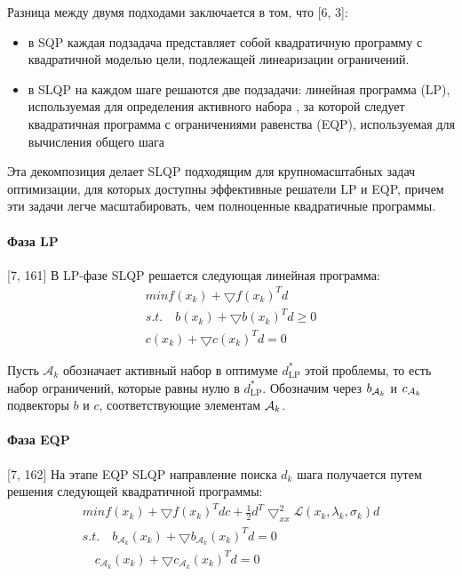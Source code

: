 \documentclass[12pt,a4paper]{article}
\begin{document}
	Разница между двумя подходами заключается в том, что [6, 3]:
	\begin{itemize}
		\item в SQP каждая подзадача представляет собой квадратичную программу с квадратичной моделью цели, подлежащей линеаризации ограничений.
		\item в SLQP на каждом шаге решаются две подзадачи: линейная программа (LP), используемая для определения активного набора , за которой следует квадратичная программа с ограничениями равенства (EQP), используемая для вычисления общего шага
	\end{itemize}
	
	Эта декомпозиция делает SLQP подходящим для крупномасштабных задач оптимизации, для которых доступны эффективные решатели LP и EQP, причем эти задачи легче масштабировать, чем полноценные квадратичные программы.
	
	\paragraph{Фаза LP}[7, 161]
	В LP-фазе SLQP решается следующая линейная программа:
	\begin{align*}
		min f(x_k) + \bigtriangledown f(x_k)^Td \\
		s.t. \quad b(x_k) + \bigtriangledown b(x_k)^Td \geq 0 \\
		c(x_k) + \bigtriangledown c(x_k)^Td=0
	\end{align*}
	
	Пусть $\mathcal{A}_{k}$ обозначает активный набор в оптимуме $ d_{\text{LP}}^{*}$ этой проблемы, то есть набор ограничений, которые равны нулю в $d_{\text{LP}}^{*}$. Обозначим через $b_{{\cal{A}}_{k}}$ и $c_{{\cal{A}}_{k}}$ подвекторы $b$ и $c$, соответствующие элементам ${\cal{A}}_{k}$.
	
	\paragraph{Фаза EQP}[7, 162]
	На этапе EQP SLQP направление поиска $d_{k}$ шага получается путем решения следующей квадратичной программы:
	\begin{align*}
		min f(x_k) + \bigtriangledown f(x_k)^Tdc+ \frac{1}{2}d^T \bigtriangledown_{xx}^{2}{\mathcal{L}}(x_k, \lambda_k, \sigma_k)d\\
		s.t. \quad b_{\mathcal{A}_k}(x_k) + \bigtriangledown  b_{\mathcal{A}_k}(x_k)^Td = 0\\
		\quad c_{\mathcal{A}_k}(x_k) + \bigtriangledown  c_{\mathcal{A}_k}(x_k)^Td=0
	\end{align*}
	
\end{document}
